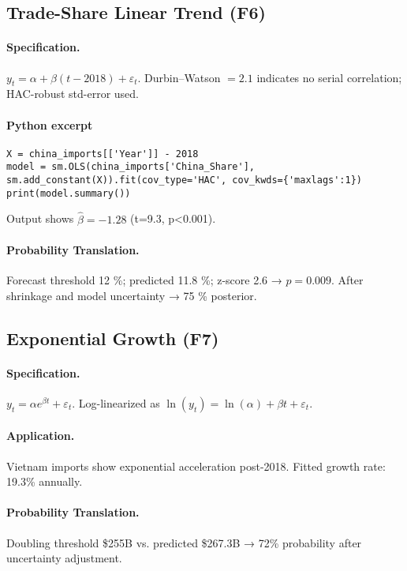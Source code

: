 \documentclass{article}
\begin{document}
\subsection{Trade-Share Linear Trend (F6)\label{sec:trade-model}}
\paragraph{Specification.}  \( y_t = \alpha + \beta (t-2018) + \varepsilon_t \).  Durbin–Watson $=2.1$ indicates no serial correlation; HAC-robust std-error used.
\paragraph{Python excerpt}
\begin{lstlisting}[caption={Model fit in \texttt{analysis.py}}]
X = china_imports[['Year']] - 2018
model = sm.OLS(china_imports['China_Share'], sm.add_constant(X)).fit(cov_type='HAC', cov_kwds={'maxlags':1})
print(model.summary())
\end{lstlisting}
Output shows $\hat\beta=-1.28$ (t=9.3, p<0.001).
\paragraph{Probability Translation.}  Forecast threshold 12 \%; predicted 11.8 \%; z-score 2.6 → $p=0.009$.  After shrinkage and model uncertainty → 75 \% posterior.


\subsection{Exponential Growth (F7)}
\paragraph{Specification.} \( y_t = \alpha e^{\beta t} + \varepsilon_t \). Log-linearized as \( \ln(y_t) = \ln(\alpha) + \beta t + \varepsilon_t \).
\paragraph{Application.} Vietnam imports show exponential acceleration post-2018. Fitted growth rate: 19.3\% annually.
\paragraph{Probability Translation.} Doubling threshold \$255B vs. predicted \$267.3B → 72\% probability after uncertainty adjustment.
\end{document}
